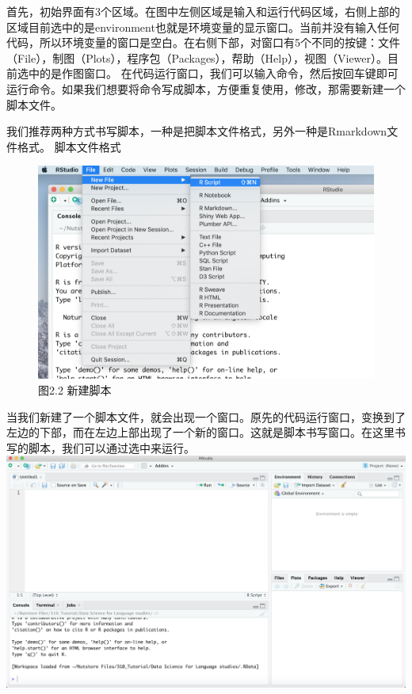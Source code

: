 \documentclass[]{book}
\begin{document}
首先，初始界面有3个区域。在图中左侧区域是输入和运行代码区域，右侧上部的区域目前选中的是environment也就是环境变量的显示窗口。当前并没有输入任何代码，所以环境变量的窗口是空白。在右侧下部，对窗口有5个不同的按键：文件（File），制图（Plots），程序包（Packages），帮助（Help），视图（Viewer）。目前选中的是作图窗口。
在代码运行窗口，我们可以输入命令，然后按回车键即可运行命令。如果我们想要将命令写成脚本，方便重复使用，修改，那需要新建一个脚本文件。

我们推荐两种方式书写脚本，一种是把脚本文件格式，另外一种是Rmarkdown文件格式。
脚本文件格式

\begin{figure}
\centering
\includegraphics{images/2.2.png}
\caption{图2.2 新建脚本}
\end{figure}

当我们新建了一个脚本文件，就会出现一个窗口。原先的代码运行窗口，变换到了左边的下部，而在左边上部出现了一个新的窗口。这就是脚本书写窗口。在这里书写的脚本，我们可以通过选中来运行。
\includegraphics{images/2.3.png}
\end{document}
